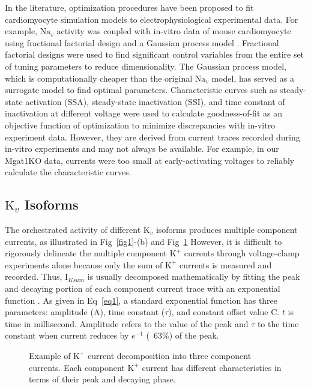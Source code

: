 \documentclass[10pt,letterpaper]{article}
\begin{document}
In the literature, optimization procedures have been proposed to fit cardiomyocyte simulation models to electrophysiological experimental data. For example, $\text{Na}_{v}$ activity was coupled with in-vitro data of mouse cardiomyocyte using fractional factorial design and a Gaussian process model \cite{du2015statistical}. Fractional factorial designs were used to find significant control variables from the entire set of tuning parameters to reduce dimensionality. The Gaussian process model, which is computationally cheaper than the original $\text{Na}_{v}$ model, has served as a surrogate model to find optimal parameters. Characteristic curves such as steady-state activation (SSA), steady-state inactivation (SSI), and time constant of inactivation at different voltage were used to calculate goodness-of-fit as an objective function of optimization to minimize discrepancies with in-vitro experiment data. However, they are derived from current traces recorded during in-vitro experiments and may not always be available. For example, in our Mgat1KO data, currents were too small at early-activating voltages to reliably calculate the characteristic curves.  

\subsection*{$\text{K}_{v}$ Isoforms}
The orchestrated activity of different $\text{K}_{v}$ isoforms produces multiple component currents, as illustrated in Fig~\ref{fig1}-(b) and Fig~\ref{fig3} However, it is difficult to rigorously delineate the multiple component $\text{K}^{+}$ currents through voltage-clamp experiments alone because only the sum of $\text{K}^{+}$ currents is measured and recorded. Thus, $\text{I}_{Ksum}$ is usually decomposed mathematically by fitting the peak and decaying portion of each component current trace with an exponential function \cite{brunet2004heterogeneous}. As given in Eq~\ref{eq1}, a standard exponential function has three parameters: amplitude ($\text{A}$), time constant ($\tau$), and constant offset value $\text{C}$. $t$ is time in millisecond. Amplitude refers to the value of the peak and $\tau$ to the time constant when current reduces by $e^{-1}$ (~63\%) of the peak. 

\begin{figure}[!ht]
    \centering
    \caption{Example of $\text{K}^{+}$ current decomposition into three component currents. Each component $\text{K}^{+}$ current has different characteristics in terms of their peak and decaying phase.}
    \label{fig3}
\end{figure}
\end{document}
